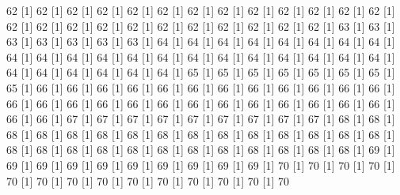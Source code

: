\documentclass[12pt]{article}
\begin{document}
\begin{Schunk}
\begin{Soutput}
[1] 62%
[1] 62%
[1] 62%
[1] 62%
[1] 62%
[1] 62%
[1] 62%
[1] 62%
[1] 62%
[1] 62%
[1] 62%
[1] 62%
[1] 62%
[1] 62%
[1] 62%
[1] 62%
[1] 62%
[1] 62%
[1] 62%
[1] 62%
[1] 62%
[1] 62%
[1] 62%
[1] 62%
[1] 63%
[1] 63%
[1] 63%
[1] 63%
[1] 63%
[1] 63%
[1] 63%
[1] 64%
[1] 64%
[1] 64%
[1] 64%
[1] 64%
[1] 64%
[1] 64%
[1] 64%
[1] 64%
[1] 64%
[1] 64%
[1] 64%
[1] 64%
[1] 64%
[1] 64%
[1] 64%
[1] 64%
[1] 64%
[1] 64%
[1] 64%
[1] 64%
[1] 64%
[1] 64%
[1] 64%
[1] 64%
[1] 64%
[1] 64%
[1] 65%
[1] 65%
[1] 65%
[1] 65%
[1] 65%
[1] 65%
[1] 65%
[1] 65%
[1] 66%
[1] 66%
[1] 66%
[1] 66%
[1] 66%
[1] 66%
[1] 66%
[1] 66%
[1] 66%
[1] 66%
[1] 66%
[1] 66%
[1] 66%
[1] 66%
[1] 66%
[1] 66%
[1] 66%
[1] 66%
[1] 66%
[1] 66%
[1] 66%
[1] 66%
[1] 66%
[1] 66%
[1] 66%
[1] 66%
[1] 66%
[1] 67%
[1] 67%
[1] 67%
[1] 67%
[1] 67%
[1] 67%
[1] 67%
[1] 67%
[1] 67%
[1] 68%
[1] 68%
[1] 68%
[1] 68%
[1] 68%
[1] 68%
[1] 68%
[1] 68%
[1] 68%
[1] 68%
[1] 68%
[1] 68%
[1] 68%
[1] 68%
[1] 68%
[1] 68%
[1] 68%
[1] 68%
[1] 68%
[1] 68%
[1] 68%
[1] 68%
[1] 68%
[1] 68%
[1] 68%
[1] 68%
[1] 68%
[1] 69%
[1] 69%
[1] 69%
[1] 69%
[1] 69%
[1] 69%
[1] 69%
[1] 69%
[1] 69%
[1] 69%
[1] 70%
[1] 70%
[1] 70%
[1] 70%
[1] 70%
[1] 70%
[1] 70%
[1] 70%
[1] 70%
[1] 70%
[1] 70%
[1] 70%
[1] 70%
[1] 70%

\end{Soutput}
\end{Schunk}
\end{document}
